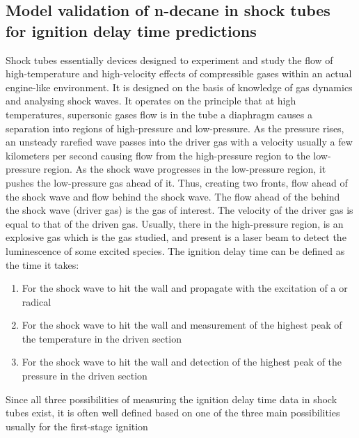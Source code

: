 \subsection{Model validation of n-decane in shock tubes for ignition delay time predictions}
Shock tubes essentially devices designed to experiment and study the flow of high-temperature and high-velocity effects of compressible gases within an actual engine-like environment. It is designed on the basis of knowledge of gas dynamics and analysing shock waves. It operates on the principle that at high temperatures, supersonic gases flow is in the tube a diaphragm causes a separation into regions of high-pressure and low-pressure. As the pressure rises, an unsteady rarefied wave passes into the driver gas with a velocity usually a few kilometers per second causing flow from the high-pressure region to the low-pressure region. As the shock wave progresses in the low-pressure region, it pushes the low-pressure gas ahead of it. Thus, creating two fronts, flow ahead of the shock wave and flow behind the shock wave. The flow ahead of the behind the shock wave (driver gas) is the gas of interest. The velocity of the driver gas is equal to  that of the driven gas\cite{Greene1964TheR.}. Usually, there in the high-pressure region, is an explosive gas which is the gas studied, and present is a laser beam to detect the luminescence of some excited species. The ignition delay time can be defined as the time it takes:
\begin{enumerate}
    \item For the shock wave to hit the wall and propagate with the excitation of a  or radical
    \item For the shock wave to hit the wall and measurement of the highest peak of the temperature in the driven section
    \item For the shock wave to hit the wall and detection of the highest peak of the pressure in the driven section
\end{enumerate}
Since all three possibilities of measuring the ignition delay time data in shock tubes exist, it is often well defined based on one of the three main possibilities usually for the first-stage ignition \cite{Davidson2004InterpretingData}\cite{Fieweger1997Self-ignitionPressure}\cite{Pfahl1996Self-ignitionConditions}\cite{Haylett2012IgnitionTube}

